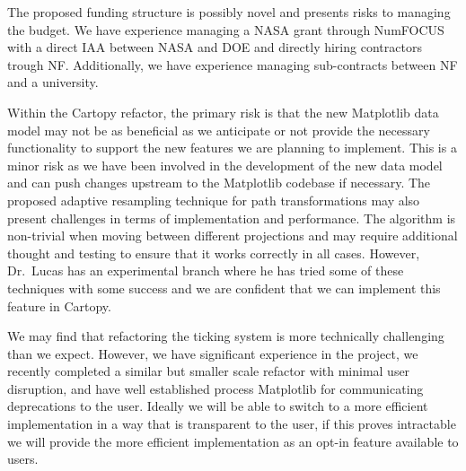 \documentclass[12pt]{article}
\numberwithin{page}{section}
\begin{document}
The proposed funding structure is possibly novel and presents risks to managing
the budget.   We have experience managing a NASA grant through NumFOCUS with a
direct IAA between NASA and DOE and directly hiring contractors trough NF.
Additionally, we have experience managing sub-contracts between NF and a
university.

Within the Cartopy refactor, the primary risk is that the new Matplotlib data
model may not be as beneficial as we anticipate or not provide the necessary
functionality to support the new features we are planning to implement. This is
a minor risk as we have been involved in the development of the new data model
and can push changes upstream to the Matplotlib codebase if necessary.
The proposed adaptive resampling technique for path transformations may also
present challenges in terms of implementation and performance. The algorithm
is non-trivial when moving between different projections and may require additional
thought and testing to ensure that it works correctly in all cases.
However, Dr.\ Lucas has an experimental branch where he has tried some of these
techniques with some success and we are confident that we can implement this
feature in Cartopy.

We may find that refactoring the ticking system is more technically challenging
than we expect.  However, we have significant experience in the project, we
recently completed a similar but smaller scale refactor with minimal user
disruption, and have well established process Matplotlib for communicating
deprecations to the user.  Ideally we will be able to switch to a more
efficient implementation in a way that is transparent to the user, if this proves
intractable we will provide the more efficient implementation as an opt-in feature
available to users.

\end{document}
